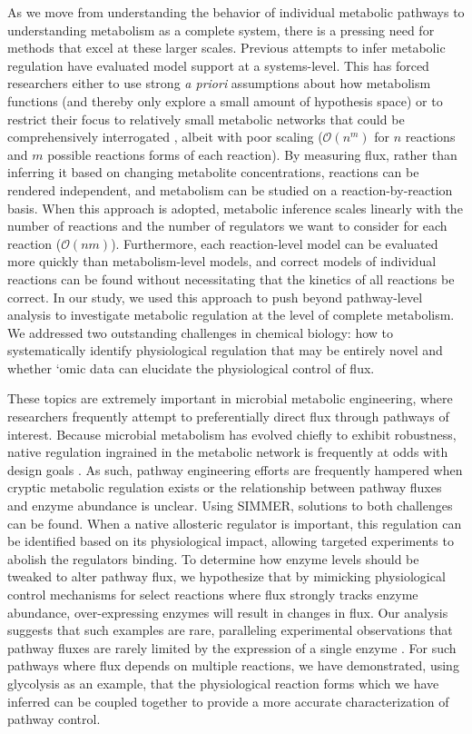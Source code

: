 As we move from understanding the behavior of individual metabolic pathways to understanding metabolism as a complete system, there is a pressing need for methods that excel at these larger scales. Previous attempts to infer metabolic regulation have evaluated model support at a systems-level.  This has forced researchers either to use strong \textit{a priori} assumptions about how metabolism functions (and thereby only explore a small amount of hypothesis space) \cite{Chassagnole:2002ty, Zampar:2013fr} or to restrict their focus to relatively small metabolic networks that could be comprehensively interrogated \cite{Link:2013dj}, albeit with poor scaling ($\mathcal{O}(n^{m})$ for $n$ reactions and $m$ possible reactions forms of each reaction). By measuring flux, rather than inferring it based on changing metabolite concentrations, reactions can be rendered independent, and metabolism can be studied on a reaction-by-reaction basis. When this approach is adopted, metabolic inference scales linearly with the number of reactions and the number of regulators we want to consider for each reaction ($\mathcal{O}(nm)$). Furthermore, each reaction-level model can be evaluated more quickly than metabolism-level models, and correct models of individual reactions can be found without necessitating that the kinetics of all reactions be correct. In our study, we used this approach to push beyond pathway-level analysis to investigate metabolic regulation at the level of complete metabolism. We addressed two outstanding challenges in chemical biology: how to systematically identify physiological regulation that may be entirely novel and whether `omic data can elucidate the physiological control of flux.

These topics are extremely important in microbial metabolic engineering, where researchers frequently attempt to preferentially direct flux through pathways of interest.  Because microbial metabolism has evolved chiefly to exhibit robustness, native regulation ingrained in the metabolic network is frequently at odds with design goals \cite{Kitano:2007cp}.  As such, pathway engineering efforts are frequently hampered when cryptic metabolic regulation exists or the relationship between pathway fluxes and enzyme abundance is unclear.  Using SIMMER, solutions to both challenges can be found.  When a native allosteric regulator is important, this regulation can be identified based on its physiological impact, allowing targeted experiments to abolish the regulators binding. To determine how enzyme levels should be tweaked to alter pathway flux, we hypothesize that by mimicking physiological control mechanisms for select reactions where flux strongly tracks enzyme abundance, over-expressing enzymes will result in changes in flux.  Our analysis suggests that such examples are rare, paralleling experimental observations that pathway fluxes are rarely limited by the expression of a single enzyme \cite{Hauf:2000vu, CornishBowden:1995fy}.  For such pathways where flux depends on multiple reactions, we have demonstrated, using glycolysis as an example, that the physiological reaction forms which we have inferred can be coupled together to provide a more accurate characterization of pathway control.

